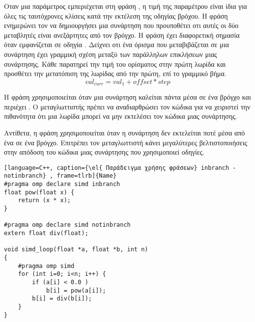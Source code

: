 Οταν μια παράμετρος εμπεριέχεται στη φράση \emph{}, η τιμή της παραμέτρου είναι ίδια για όλες τις ταυτόχρονες κλίσεις κατά την εκτέλεση της οδηγίας \emph{} βρόχου. Η φράση \emph{} ενημερώνει τον \emph{} να δημιουργήσει μια \emph{} συνάρτηση που προυποθέτει οτι αυτές οι δύο μεταβλητές είναι ανεξάρτητες από τον βρόγχο.
Η φράση \emph{} έχει διαφορετική σημασία όταν εμφανίζεται σε οδηγία \emph{}. Δείχνει οτι ένα όρισμα που μεταβιβάζεται σε μια συνάρτηση έχει γραμμική σχέση μεταξύ των παράλληλων επικλήσεων μιας συνάρτησης.
Κάθε \emph{} παρατηρεί την τιμή του ορίσματος στην πρώτη λωρίδα και προσθέτει την μετατόπιση της \emph{} λωρίδας από την πρώτη, επί το γραμμικό βήμα.
$$val_{curr} = val_1 + offset * step $$

Η φράση \emph{} χρησιμοποιείται όταν μια συνάρτηση καλείται πάντα μέσα σε ένα βρόγχο \emph{} και περιέχει \emph{}. Ο μεταγλωττιστής πρέπει να αναδιαρθρώσει τον κώδικα για να χειριστεί την πιθανότητα ότι μια λωρίδα \emph{} μπορεί να μην εκτελέσει τον κώδικα μιας συνάρτησης.

Αντίθετα, η φράση \emph{} χρησιμοποιείται όταν η συνάρτηση δεν εκτελείται ποτέ μέσα από ένα \emph{} σε ένα \emph{} βρόγχο. Επιτρέπει τον μεταγλωττιστή κάνει μεγαλύτερες βελτιστοποιήσεις στην απόδοση του κώδικα μιας συνάρτησης που χρησιμοποιεί \emph{} οδηγίες.

\clearpage
{}
\begin{lstlisting}[language=C++, caption={\el{ Παράδειγμα χρήσης φράσεων} inbranch - notinbranch} , frame=tlrb]{Name}
#pragma omp declare simd inbranch
float pow(float x) {
	return (x * x);
}

#pragma omp declare simd notinbranch
extern float div(float);

void simd_loop(float *a, float *b, int n)
{
	#pragma omp simd
	for (int i=0; i<n; i++) {
		if (a[i] < 0.0 )
			b[i] = pow(a[i]);
		b[i] = div(b[i]);
	}
}
\end{lstlisting}
